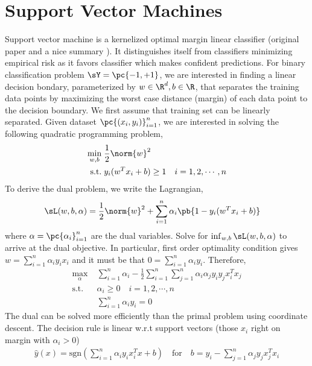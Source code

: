 \documentclass[11pt]{article}
\begin{document}
 
\section{Support Vector Machines}


Support vector machine is a kernelized optimal margin linear classifier (original paper \cite{boserTrainingAlgorithmOptimal1992} and a nice summary \cite{vertPrimerKernelMethods2004}). It distinguishes itself from classifiers minimizing empirical risk as it favors classifier which makes confident predictions. For binary classification problem $\sY=\pc{-1,+1}$, we are interested in finding a linear decision bondary, parameterized by $w\in\R^d,b\in\R$, that separates the training data points by maximizing the worst case distance (margin) of each data point to the decision boundary. We first assume that training set can be linearly separated. Given dataset $\pc{(x_i,y_i)}_{i=1}^n$, we are interested in solving the following quadratic programming problem,
\begin{align*}
    \min_{w,b}
        \;& \frac{1}{2} \norm{w}^2 \\
    \text{s.t.}
        \;& y_i(w^Tx_i + b) \geq 1 \quad i=1,2,\cdots,n
\end{align*}
To derive the dual problem, we write the Lagrangian, 
\begin{align}
    \sL(w,b,\alpha)
        &= \frac{1}{2} \norm{w}^2 + \sum_{i=1}^n \alpha_i \pb{ 1 - y_i(w^Tx_i+b) }
\end{align}
where $\alpha = \pc{\alpha_i}_{i=1}^n$ are the dual variables. Solve for $\inf_{w,b} \sL(w,b,\alpha)$ to arrive at the dual objective. In particular, first order optimality condition gives $w = \sum_{i=1}^n \alpha_i y_i x_i$ and it must be that $0=\sum_{i=1}^n \alpha_i y_i$. Therefore, 
\begin{align*}
    \max_{\alpha}
        \;& \sum_{i=1}^n \alpha_i - \frac{1}{2} \sum_{i=1}^n\sum_{j=1}^n \alpha_i \alpha_j y_i y_j x_i^Tx_j \\
    \text{s.t.}
        \;& \alpha_i \geq 0 \quad i=1,2,\cdots, n
            \tag{dual feasibility} \\
        & \sum_{i=1}^n \alpha_i y_i = 0 
            \tag{from $\nabla_b \sL = 0$}
\end{align*}
The dual can be solved more efficiently than the primal problem using coordinate descent. The decision rule is linear w.r.t support vectors (those $x_i$ right on margin with $\alpha_i > 0$)
\begin{align}
    \hat{y}(x) = \text{sgn}\left(
        \sum_{i=1}^n \alpha_i y_i x_i^T x + b
    \right)
    \quad\text{for}\quad
    b 
        = y_i - \sum_{j=1}^n \alpha_j y_j x_j^T x_i
\end{align}
\end{document}
